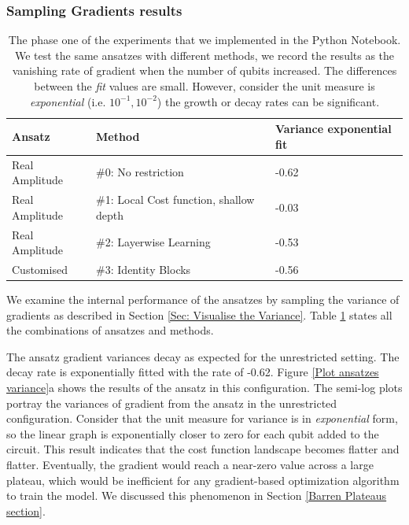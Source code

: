 
\subsubsection{Sampling Gradients results} \label{Sec: Sampling Gradients results}
\begin{table}
    \centering
    \begin{tabular}{|| l l l ||}
        \hline
        \textbf{Ansatz} & \textbf{Method}                         & \textbf{Variance exponential fit} \\[0.5ex]
        \hline \hline
        Real Amplitude  & \#0: No restriction                     & -0.62                             \\
        Real Amplitude  & \#1: Local Cost function, shallow depth & -0.03                             \\
        Real Amplitude  & \#2: Layerwise Learning                 & -0.53                             \\
        Customised      & \#3: Identity Blocks                    & -0.56                             \\
        \hline
    \end{tabular}
    \caption{
        The phase one of the experiments that we implemented in the Python Notebook.
        We test the same ansatzes with different methods, we record the results as the vanishing rate of gradient when the number of qubits increased.
        The differences between the \emph{fit} values are small.
        However, consider the unit measure is \emph{exponential} (i.e. $10^{-1}, 10^{-2}$) the growth or decay rates can be significant.
    }
    \label{Tab: Experiment Phase 1 Res}
\end{table}

We examine the internal performance of the ansatzes by sampling the variance of gradients as described in Section \ref{Sec: Visualise the Variance}.
Table \ref{Tab: Experiment Phase 1 Res} states all the combinations of ansatzes and methods.

The ansatz gradient variances decay as expected for the unrestricted setting.
The decay rate is exponentially fitted with the rate of -0.62.
Figure \ref{Plot ansatzes variance}a shows the results of the ansatz in this configuration.
The semi-log plots portray the variances of gradient from the ansatz in the unrestricted configuration.
Consider that the unit measure for variance is in \emph{exponential} form, so the linear graph is exponentially closer to zero for each qubit added to the circuit.
This result indicates that the cost function landscape becomes flatter and flatter.
Eventually, the gradient would reach a near-zero value across a large plateau, which would be inefficient for any gradient-based optimization algorithm to train the model.
We discussed this phenomenon in Section \ref{Barren Plateaus section}.


